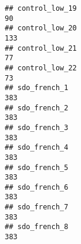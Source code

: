 \documentclass[
]{article}
\begin{document}
\begin{verbatim}
## control_low_19                                                                                                                                                                                                              90
## control_low_20                                                                                                                                                                                                             133
## control_low_21                                                                                                                                                                                                              77
## control_low_22                                                                                                                                                                                                              73
## sdo_french_1                                                                                                                                                                                                               383
## sdo_french_2                                                                                                                                                                                                               383
## sdo_french_3                                                                                                                                                                                                               383
## sdo_french_4                                                                                                                                                                                                               383
## sdo_french_5                                                                                                                                                                                                               383
## sdo_french_6                                                                                                                                                                                                               383
## sdo_french_7                                                                                                                                                                                                               383
## sdo_french_8                                                                                                                                                                                                               383

\end{verbatim}
\end{document}
